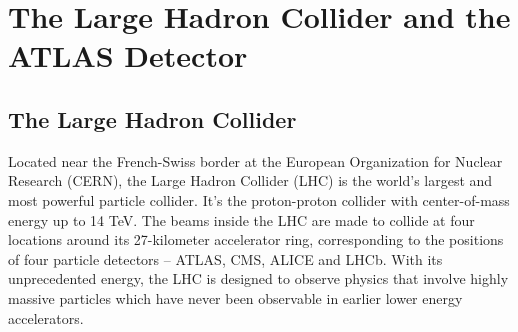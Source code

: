 \chapter{The Large Hadron Collider and the ATLAS Detector}

\section{The Large Hadron Collider}
Located near the French-Swiss border at the European Organization for Nuclear Research (CERN),
the Large Hadron Collider (LHC) is the world’s largest and most powerful particle collider.
It's the proton-proton collider with center-of-mass energy up to 14 TeV.
The beams inside the LHC are made to collide at four locations around its 27-kilometer accelerator ring, 
corresponding to the positions of four particle detectors – ATLAS, CMS, ALICE and LHCb.
With its unprecedented energy, the LHC is designed to observe physics that involve highly massive particles
which have never been observable in earlier lower energy accelerators.


